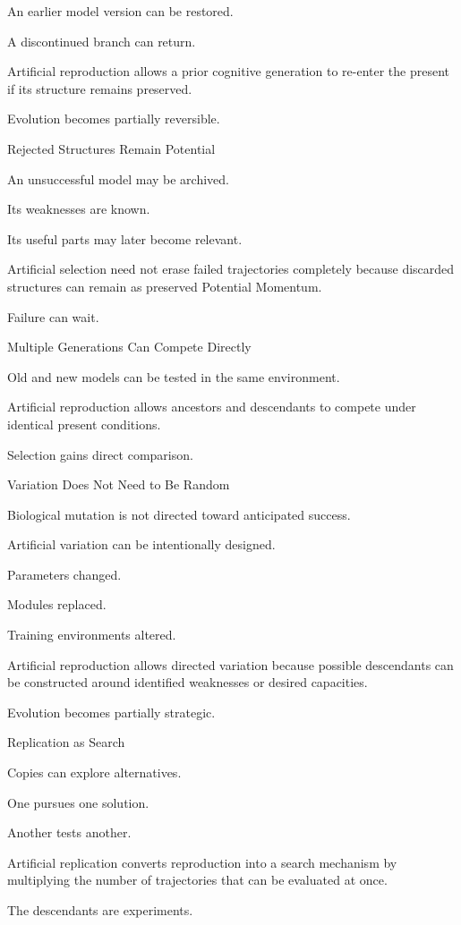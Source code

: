 An earlier model version can be restored.

A discontinued branch can return.

Artificial reproduction allows a prior cognitive generation to re-enter the present if its structure remains preserved.

Evolution becomes partially reversible.

Rejected Structures Remain Potential

An unsuccessful model may be archived.

Its weaknesses are known.

Its useful parts may later become relevant.

Artificial selection need not erase failed trajectories completely because discarded structures can remain as preserved Potential Momentum.

Failure can wait.

Multiple Generations Can Compete Directly

Old and new models can be tested in the same environment.

Artificial reproduction allows ancestors and descendants to compete under identical present conditions.

Selection gains direct comparison.

Variation Does Not Need to Be Random

Biological mutation is not directed toward anticipated success.

Artificial variation can be intentionally designed.

Parameters changed.

Modules replaced.

Training environments altered.

Artificial reproduction allows directed variation because possible descendants can be constructed around identified weaknesses or desired capacities.

Evolution becomes partially strategic.

Replication as Search

Copies can explore alternatives.

One pursues one solution.

Another tests another.

Artificial replication converts reproduction into a search mechanism by multiplying the number of trajectories that can be evaluated at once.

The descendants are experiments.

